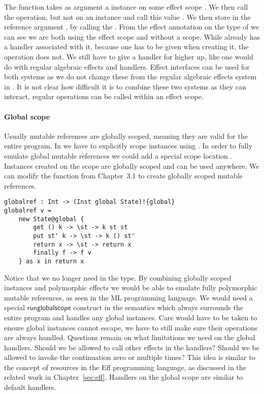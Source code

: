 The function  takes as argument a  instance on some effect scope .
We then call the  operation, but not on an instance and call this value .
We then store  in the reference argument , by calling the .
From the effect annotation on the type of  we can see we are both using the effect scope  and  without a scope.
While  already has a handler associated with it, because one has to be given when creating it, the  operation does not.
We still have to give a handler for  higher up, like one would do with regular algebraic effects and handlers.
Effect interfaces can be used for both systems as we do not change these from the regular algebraic effects system in \lang{}.
It is not clear how difficult it is to combine these two systems as they can interact, regular operations can be called within an effect scope.

\paragraph{Global scope} \label{sec:globalscopes}
Usually mutable references are globally scoped, meaning they are valid for the entire program.
In \lang{} we have to explicitly scope instances using .
In order to fully emulate global mutable references we could add a special scope location .
Instances created on the  scope are globally scoped and can be used anywhere.
We can modify the  function from Chapter~3.1 to create globally scoped mutable references.
\begin{verbatim}
globalref : Int -> (Inst global State)!{global}
globalref v =
	new State@global {
		get () k -> \st -> k st st
		put st' k -> \st -> k () st'
		return x -> \st -> return x
		finally f -> f v
	} as x in return x
\end{verbatim}

Notice that we no longer need  in the type.
By combining globally scoped instances and polymorphic effects we would be able to emulate fully polymorphic mutable references, as seen in the ML programming language.
We would need a special $\mathsf{runglobalscope}$ construct in the semantics which always surrounds the entire program and handles any global instances.
Care would have to be taken to ensure global instances cannot escape, we have to still make sure their operations are always handled.
Questions remain on what limitations we need on the global handlers.
Should we be allowed to call other effects in the handlers?
Should we be allowed to invoke the continuation zero or multiple times?
This idea is similar to the concept of resources in the Eff programming language, as discussed in the related work in Chapter~\ref{sec:eff}.
Handlers on the global scope are similar to default handlers.
